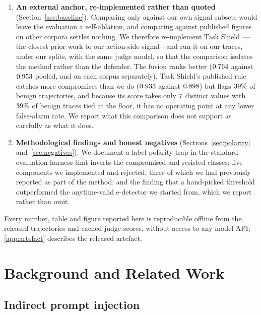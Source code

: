 \documentclass[preprint,12pt,number]{elsarticle}
\theoremstyle{definition}
\begin{document}
\begin{enumerate}
\item \textbf{An external anchor, re-implemented rather than quoted}
(Section~\ref{sec:baseline}). Comparing only against our own signal subsets would
leave the evaluation a self-ablation, and comparing against published figures on
other corpora settles nothing. We therefore re-implement Task
Shield~\citep{jia2024taskshield}---the closest prior work to our action-side
signal---and run it on our traces, under our splits, with the same judge model, so
that the comparison isolates the method rather than the defender. The fusion ranks
better ($0.764$ against $0.953$ pooled, and on each corpus
separately). Task Shield's published rule catches more compromises than we do
($0.933$ against $0.898$) but flags $39\%$ of benign
trajectories, and because its score takes only $7$ distinct values
with $39\%$ of benign traces tied at the floor, it has no operating
point at any lower false-alarm rate. We report what this comparison does not
support as carefully as what it does.

\item \textbf{Methodological findings and honest negatives}
(Sections~\ref{sec:polarity} and~\ref{sec:negatives}). We document a
label-polarity trap in the standard evaluation harness that inverts the
compromised and resisted classes; five components we implemented and rejected,
three of which we had previously reported as part of the method; and the finding
that a hand-picked threshold outperformed the anytime-valid e-detector we
started from, which we report rather than omit.
\end{enumerate}

Every number, table and figure reported here is reproducible offline from the
released trajectories and cached judge scores, without access to any model API;
\ref{app:artefact} describes the released artefact.

\section{Background and Related Work}\label{sec:related}

\subsection{Indirect prompt injection}
\end{document}
